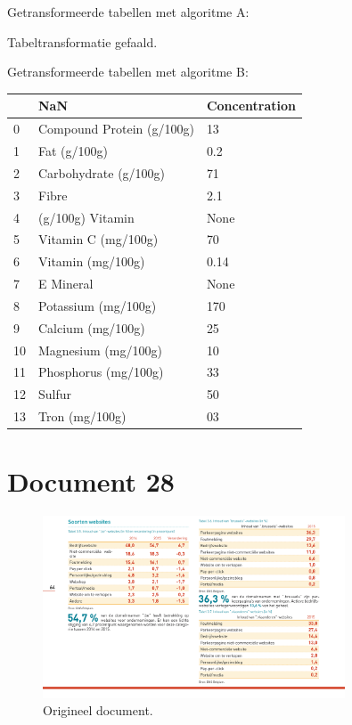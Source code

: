 Getransformeerde tabellen met algoritme A:

Tabeltransformatie gefaald.

Getransformeerde tabellen met algoritme B:

\begin{tabular}{lll}
\toprule
{} &                        NaN & Concentration \\
\midrule
0  &  Compound Protein (g/100g) &            13 \\
1  &               Fat (g/100g) &           0.2 \\
2  &      Carbohydrate (g/100g) &            71 \\
3  &                      Fibre &           2.1 \\
4  &           (g/100g) Vitamin &          None \\
5  &        Vitamin C (mg/100g) &            70 \\
6  &          Vitamin (mg/100g) &          0.14 \\
7  &                  E Mineral &          None \\
8  &        Potassium (mg/100g) &           170 \\
9  &          Calcium (mg/100g) &            25 \\
10 &        Magnesium (mg/100g) &            10 \\
11 &       Phosphorus (mg/100g) &            33 \\
12 &                     Sulfur &            50 \\
13 &             Tron (mg/100g) &            03 \\
\bottomrule
\end{tabular}
\section{Document 28}

\begin{figure}[H]
    \centering
    \includegraphics[width=0.8\textwidth]{test-resultaten/28/original.png}
    \caption{Origineel document.}
\end{figure}

